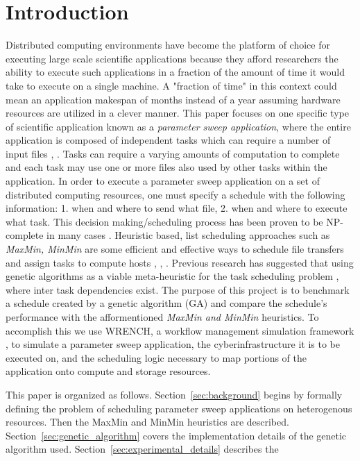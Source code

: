 \section{Introduction}

Distributed computing environments have become the platform of choice for
executing large scale scientific applications because they afford researchers
the ability to execute such applications in a fraction of the amount of time it
would take  to execute on a single machine. A "fraction of time" in this context
could mean an application makespan of months instead of a year assuming hardware
resources are utilized in a clever manner.  This paper focuses on one specific
type of scientific application known as a \textit{parameter sweep application},
where the entire application is composed of independent tasks which can require
a number of input files  \cite{Casanova-param-sweep-00},
\cite{Casanova-apples-param-sweep-00}. Tasks can require a varying amounts of
computation to complete and each task may use one or more files also used by
other tasks within the application. In order to execute a parameter sweep
application on a set of distributed computing resources, one must specify a
schedule with the following information: 1. when and where to send what file, 2.
when and where to execute what task. This decision making/scheduling process has
been proven to be NP-complete in many cases
\cite{Giersch-task-sharing-files-04}. Heuristic based, list scheduling
approaches such as \textit{MaxMin, MinMin} are some efficient and effective ways
to schedule file transfers and assign tasks to compute hosts
\cite{Casanova-param-sweep-00}, \cite{Casanova-apples-param-sweep-00},
\cite{Giersch-task-sharing-files-04}. Previous research has suggested that using
genetic algorithms as a viable meta-heuristic for the task scheduling problem
\cite{wang-task-matching-97} , \cite{wu-incremental-genetic-04} where inter task
dependencies exist. The purpose of this project is to benchmark a schedule
created by a genetic algorithm (GA) and compare the schedule's performance with
the afformentioned \textit{MaxMin and MinMin} heuristics. To accomplish this we
use WRENCH, a workflow management simulation framework
\cite{casanova-works-2018}, to simulate a parameter sweep application, the
cyberinfrastructure it is to be executed on, and the scheduling logic necessary
to map portions of the application onto compute and storage resources.

This paper is organized as follows. Section~\ref{sec:background} begins by
formally defining the problem of scheduling parameter sweep applications on
heterogenous resources. Then the MaxMin and MinMin heuristics are described.
Section~\ref{sec:genetic_algorithm} covers the implementation details of
the genetic algorithm used. Section~\ref{sec:experimental_details} describes
the 
